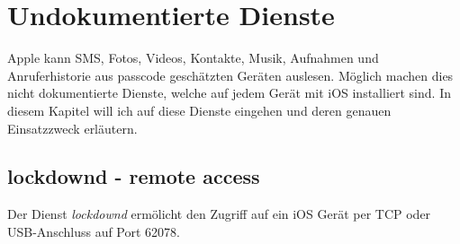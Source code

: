 \section{Undokumentierte Dienste}
	Apple kann SMS, Fotos, Videos, Kontakte, Musik, Aufnahmen und Anruferhistorie
	aus passcode geschätzten Geräten auslesen. Möglich machen dies nicht
	dokumentierte Dienste, welche auf jedem Gerät mit iOS installiert sind. In
	diesem Kapitel will ich auf diese Dienste eingehen und deren genauen
	Einsatzzweck erläutern.
	\subsection{lockdownd - remote access}
	Der Dienst \textsl{lockdownd} ermölicht den Zugriff auf ein iOS Gerät
	per TCP oder USB-Anschluss auf Port 62078.